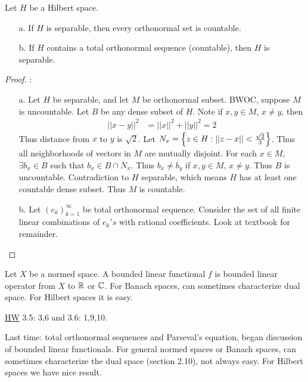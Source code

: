 \documentclass[]{article}
\begin{document}
\begin{theorem}
	Let $H$ be a Hilbert space.
	\begin{enumerate}
		\item[a.] If $H$ is separable, then every orthonormal set is countable.
		\item[b.] If $H$ contains a total orthonormal sequence (countable), then $H$ is separable.
	\end{enumerate}
\end{theorem}
\begin{proof}:
	\begin{enumerate}
		\item[a.] Let $H$ be separable, and let $M$ be orthonormal subset.
			BWOC, suppose $M$ is uncountable.
			Let $B$ be any dense subset of $H$.
			Note if $x,y\in M$, $x\neq y$, then
			\begin{align*}
				||x-y||^2 &= ||x||^2 + ||y||^2 = 2
			\end{align*}
			Thus distance from $x$ to $y$ is $\sqrt2$.
			Let $N_x = \left\{ z\in H : ||z-x||<\frac{\sqrt2}3 \right\}$.
			Thus all neighborhoods of vectors in $M$ are mutually disjoint.
			For each $x\in M$, $\exists b_x\in B$ such that $b_x\in B\cap N_x$.
			Thus $b_x\neq b_y$ if $x,y\in M$, $x\neq y$. Thus $B$ is uncountable.
			Contradiction to $H$ separable, which means $H$ has at least one countable dense subset.
			Thus $M$ is countable.
		\item[b.] Let $(e_k)_{k=1}^\infty$ be total orthonormal sequence.
			Consider the set of all finite linear combinations of $e_k's$ with rational coefficients. Look at textbook for remainder.
	\end{enumerate}
\end{proof}

\begin{recall}
	Let $X$ be a normed space.
	A bounded linear functional $f$ is bounded linear operator from $X$ to $\mathbb{R}$ or $\mathbb{C}$.
	For Banach spaces, can sometimes characterize dual space. For Hilbert spaces it is easy.
\end{recall}

\ul{HW} 3.5: 3,6 and 3.6: 1,9,10.

Last time: total orthonormal sequences and Parseval's equation, began discussion of bounded linear functionals.
For general normed spaces or Banach spaces, can sometimes characterize the dual space (section 2.10), not always easy.
For Hilbert spaces we have nice result.
\end{document}
